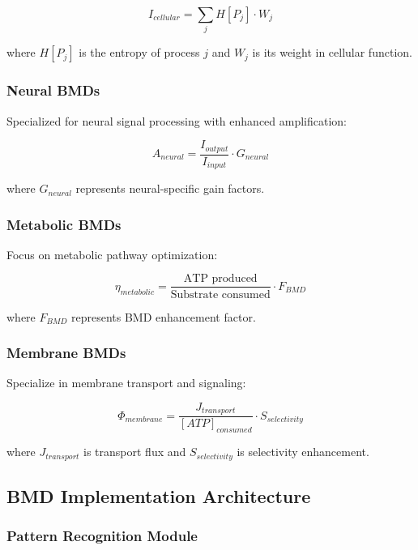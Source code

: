 \documentclass[12pt,a4paper]{article}
\begin{document}
\begin{equation}
I_{cellular} = \sum_j H[P_j] \cdot W_j
\end{equation}

where $H[P_j]$ is the entropy of process $j$ and $W_j$ is its weight in cellular function.

\subsubsection{Neural BMDs}

Specialized for neural signal processing with enhanced amplification:

\begin{equation}
A_{neural} = \frac{I_{output}}{I_{input}} \cdot G_{neural}
\end{equation}

where $G_{neural}$ represents neural-specific gain factors.

\subsubsection{Metabolic BMDs}

Focus on metabolic pathway optimization:

\begin{equation}
\eta_{metabolic} = \frac{\text{ATP produced}}{\text{Substrate consumed}} \cdot F_{BMD}
\end{equation}

where $F_{BMD}$ represents BMD enhancement factor.

\subsubsection{Membrane BMDs}

Specialize in membrane transport and signaling:

\begin{equation}
\Phi_{membrane} = \frac{J_{transport}}{[ATP]_{consumed}} \cdot S_{selectivity}
\end{equation}

where $J_{transport}$ is transport flux and $S_{selectivity}$ is selectivity enhancement.

\subsection{BMD Implementation Architecture}

\subsubsection{Pattern Recognition Module}
\end{document}
